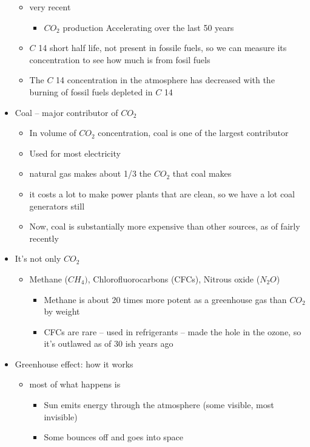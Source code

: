 \documentclass{article}
\theoremstyle{definition}
\begin{document}
\begin{itemize}
\begin{itemize}
			\item very recent
				\begin{itemize}
					\item $CO_2$ production Accelerating over the last 50 years
				\end{itemize}
			\item $C$ 14 short half life, not present in fossile fuels, so we can measure its concentration  to see how much is from fosil fuels
			\item The $C$ 14 concentration in the atmosphere has decreased with the burning of fossil fuels depleted in $C$ 14
		\end{itemize}
	\item Coal -- major contributor of $CO_2$
		\begin{itemize}
			\item In volume of $CO_2$ concentration, coal is one of the largest contributor
			\item Used for most electricity
			\item natural gas makes about 1/3 the $CO_2$ that coal makes
			\item it costs a lot to make power plants that are clean, so we have a lot coal generators still
			\item Now, coal is substantially more expensive than other sources, as of fairly recently
		\end{itemize}
	\item It's not only $CO_2$ 
		\begin{itemize}
			\item Methane ($CH_4)$, Chlorofluorocarbons (CFCs), Nitrous oxide ($N_2O$)
				\begin{itemize}
					\item Methane is about 20 times more potent as a greenhouse gas than $CO_2$ by weight
					\item CFCs are rare -- used in refrigerants -- made the hole in the ozone, so it's outlawed as of 30 ish years ago
				\end{itemize}
		\end{itemize}
	\item Greenhouse effect: how it works
		\begin{itemize}
			\item most of what happens is 
				\begin{itemize}
					\item Sun emits energy through the atmosphere (some visible, most invisible)
					\item Some bounces off and goes into space

\end{itemize}
\end{itemize}
\end{itemize}
\end{document}
